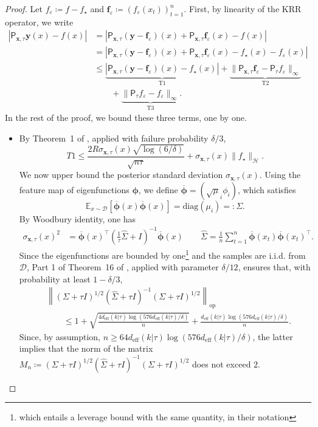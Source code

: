 \documentclass{article}
\let\cite\citep
\numberwithin{theorem}{section}
\theoremstyle{definition}
\newcommand{\fwithin}{f_\star}
\newcommand{\inpdist}{\Ds}
\newcommand{\Ds}{\mathcal D}
\newcommand{\Hs}{\mathcal H}
\begin{document}
\begin{proof}
    Let $f_\varepsilon\coloneqq f-\fwithin$ and $\bm f_\varepsilon\coloneqq (f_\varepsilon(x_t))_{t=1}^n$.
    First, by linearity of the KRR operator, we write
    \begin{align*}
        |\mathsf{P}_{\bm x,\tau}\bm y(x)-f(x)| &= |\mathsf{P}_{\bm x,\tau}(\bm y-\bm f_\varepsilon)(x)+\mathsf{P}_{\bm x,\tau}\bm f_\varepsilon(x)-f(x)|\\
        &= |\mathsf{P}_{\bm x,\tau}(\bm y-\bm f_\varepsilon)(x)+\mathsf{P}_{\bm x,\tau}\bm f_\varepsilon(x)-\fwithin(x)-f_\varepsilon(x)|\\
        &\le \underbrace{|\mathsf{P}_{\bm x,\tau}(\bm y-\bm f_\varepsilon)(x)-\fwithin(x)|}_{\text{T1}}+\underbrace{\|\mathsf{P}_{\bm x,\tau}\bm f_\varepsilon-\mathsf{P}_{\tau}f_\varepsilon\|_\infty}_{\text{T2}}\\
        &\qquad +\underbrace{\|\mathsf{P}_{\tau}f_\varepsilon-f_\varepsilon\|_\infty}_{\text{T3}}.
    \end{align*}
    In the rest of the proof, we bound these three terms, one by one.
    \begin{itemize}
    \item [(T1)] By Theorem~1 of \cite{vakili2021optimal}, applied with failure probability $\delta/3$,
    $$T1\le \frac{2R\sigma_{\bm x,\tau}(x)\sqrt{\log(6/\delta)}}{\sqrt {n\tau}}+\sigma_{\bm x,\tau}(x)\|\fwithin\|_{\Hs}.$$
    We now upper bound the posterior standard deviation $\sigma_{\bm x,\tau}(x)$. Using the feature map of eigenfunctions $\bm \phi$, we define $\overline{\bm \phi}=(\sqrt \mu_i\phi_i)$, which satisfies
    $$\mathbb E_{x\sim \inpdist}[\overline{\bm \phi}(x)\overline{\bm \phi}(x)]=\text{diag}(\mu_i)=:\Sigma.$$
    By Woodbury identity, one has
    \begin{align*}
        \sigma_{\bm x,\tau}(x)^2&=\overline{\bm \phi}(x)^\top\left(\frac{1}{\tau}\widehat \Sigma+I\right)^{-1}\overline{\bm \phi}(x)\qquad \widehat\Sigma=\frac{1}{n}\sum_{t=1}^n \overline{\bm \phi}(x_t)\overline{\bm \phi}(x_t)^\top.
    \end{align*}
    Since the eigenfunctions are bounded by one\footnote{which entails a leverage bound with the same quantity, in their notation} and the samples are i.i.d. from $\inpdist$, Part 1 of Theorem~16 of \cite{hsu2012random}, applied with parameter $\delta/12$, ensures that, with probability at least $1-\delta/3$,
    \begin{align*}
        &\left\|(\Sigma+\tau I)^{1/2}(\widehat \Sigma+\tau I)^{-1}(\Sigma+\tau I)^{1/2}\right\|_{\text{op}}\\
        &\qquad\le 1+\sqrt{\frac{4d_\text{eff}(k|\tau)\log(576d_\text{eff}(k|\tau)/\delta)}{n}}+\frac{d_\text{eff}(k|\tau)\log(576d_\text{eff}(k|\tau)/\delta)}{n}.
    \end{align*}
    Since, by assumption, $n\ge 64d_\text{eff}(k|\tau)\log(576d_\text{eff}(k|\tau)/\delta)$, the latter implies that the norm of the matrix $M_n\coloneqq(\Sigma+\tau I)^{1/2}(\widehat \Sigma+\tau I)^{-1}(\Sigma+\tau I)^{1/2}$ does not exceed $2$.


\end{itemize}
\end{proof}
\end{document}
